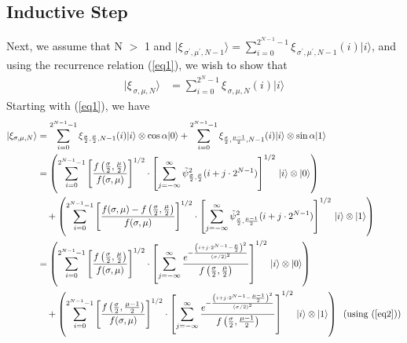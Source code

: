 \documentclass[11pt]{article}
\begin{document}
\subsection*{Inductive Step}
Next, we assume that N $>$ 1 and $\vert \xi_{\,\sigma^{\prime}, \mu^{\prime}, N-1} \rangle = \sum_{i=0}^{2^{N-1} - 1} \xi_{\,\sigma^{\prime}, \mu^{\prime}, N-1} (i) \vert i \rangle$, and using the recurrence relation (\ref{eq1}), we wish to show that
\begin{align*}
\vert \xi_{\,\sigma, \mu, N} \rangle &= \sum_{i=0}^{2^{N} - 1} \xi_{\,\sigma, \mu, N} (i) \vert i \rangle
\end{align*}
Starting with (\ref{eq1}),  we have
\begin{align*}
\vert \xi_{\sigma, \mu, N} \rangle &= \sum_{i=0}^{2^{N-1} - 1} \xi_{\frac{\sigma}{2}, \frac{\mu}{2}, N-1} (i) \vert i \rangle  \otimes \text{cos} \, \alpha \vert 0 \rangle + \sum_{i=0}^{2^{N-1} - 1} \xi_{\frac{\sigma}{2}, \frac{\mu - 1}{2}, N-1} (i) \vert i \rangle \otimes \text{sin} \, \alpha \vert 1 \rangle \\
&= \left( \sum_{i=0}^{2^{N-1} - 1}  \left[ \frac{f\left(\frac{\sigma}{2}, \frac{\mu}{2}\right)}{f(\sigma, \mu)} \right]^{1/2} \cdot \left[ \sum_{j=-\infty}^{\infty} \tilde{\psi}_{\frac{\sigma}{2}, \frac{\mu}{2}}^{2} (i + j \cdot 2^{N-1}) \right]^{1/2} \, \vert i \rangle \otimes \vert 0 \rangle \right) \\
& \quad + \left( \sum_{i=0}^{2^{N-1} - 1}  \left[ \frac{f(\sigma, \mu) - f\left(\frac{\sigma}{2}, \frac{\mu}{2}\right)}{f(\sigma, \mu)} \right]^{1/2} \cdot \left[ \sum_{j=-\infty}^{\infty} \tilde{\psi}_{\frac{\sigma}{2}, \frac{\mu - 1}{2}}^{2} (i + j \cdot 2^{N-1}) \right]^{1/2} \, \vert i \rangle \otimes \vert 1 \rangle \right) \\
&= \left( \sum_{i=0}^{2^{N-1} - 1}  \left[ \frac{f\left(\frac{\sigma}{2}, \frac{\mu}{2}\right)}{f(\sigma, \mu)} \right]^{1/2} \cdot \left[ \sum_{j=-\infty}^{\infty} \frac{e^{-\frac{\left( i + j \cdot 2^{N-1} - \frac{\mu}{2} \right)^2}{(\sigma/2)^2}}}{f\left(\frac{\sigma}{2}, \frac{\mu}{2}\right)} \right]^{1/2} \, \vert i \rangle \otimes \vert 0 \rangle \right) \\
& \quad + \left( \sum_{i=0}^{2^{N-1} - 1}  \left[ \frac{f\left(\frac{\sigma}{2}, \frac{\mu - 1}{2}\right)}{f(\sigma, \mu)} \right]^{1/2} \cdot \left[ \sum_{j=-\infty}^{\infty} \frac{e^{-\frac{\left( i + j \cdot 2^{N-1} - \frac{\mu - 1}{2} \right)^2}{(\sigma/2)^2}}}{f\left(\frac{\sigma}{2}, \frac{\mu-1}{2}\right)} \right]^{1/2} \, \vert i \rangle \otimes \vert 1 \rangle \right) \;\; (\text{using } (\ref{eq2})) \\

\end{align*}
\end{document}
